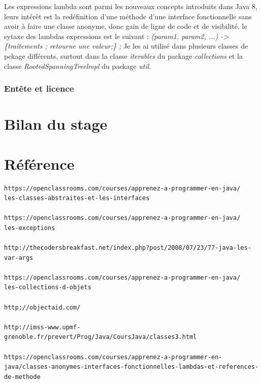 \documentclass[12pt]{report}
\begin{document}
Les expressions lambda sont parmi les nouveaux concepts introduits dans Java 8, leurs intérêt est la redéfinition d'une méthode d'une interface fonctionnelle sans avoir à faire une classe anonyme, donc gain de ligne de code et de visibilité.\newline
le sytaxe des lambdas expressions est le suivant :\newline
\textit{(param1, param2, ...) -> \{traitements ; retourne une valeur;\} ;} \newline
Je les ai utilisé dans plusieurs classes de pckage différents, surtout dans la classe \textit{iterables} du package \textit{collections} et la classe \textit{RootedSpanningTreelmpl} du package \textit{util}.\newline

\subsubsection{Entête et licence}



\section{Bilan du stage}

\newpage
\section{Référence}
\begin{verbatim}
https://openclassrooms.com/courses/apprenez-a-programmer-en-java/
les-classes-abstraites-et-les-interfaces

https://openclassrooms.com/courses/apprenez-a-programmer-en-java/
les-exceptions

http://thecodersbreakfast.net/index.php?post/2008/07/23/77-java-les-var-args

https://openclassrooms.com/courses/apprenez-a-programmer-en-java/
les-collections-d-objets

http://objectaid.com/

http://imss-www.upmf-grenoble.fr/prevert/Prog/Java/CoursJava/classes3.html

https://openclassrooms.com/courses/apprenez-a-programmer-en-java/classes-anonymes-interfaces-fonctionnelles-lambdas-et-references-de-methode
\end{verbatim}
\end{document}
